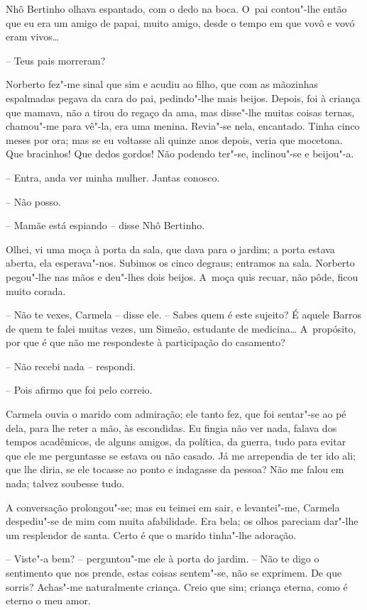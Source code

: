 Nhô Bertinho olhava espantado, com o dedo na boca. O~pai contou"-lhe
então que eu era um amigo de papai, muito amigo, desde o tempo em que
vovô e vovó eram vivos\ldots{}

-- Teus pais morreram?

Norberto fez"-me sinal que sim e acudiu ao filho, que com as mãozinhas
espalmadas pegava da cara do pai, pedindo"-lhe mais beijos. Depois, foi à
criança que mamava, não a tirou do regaço da ama, mas disse"-lhe muitas
coisas ternas, chamou"-me para vê"-la, era uma menina. Revia"-se nela,
encantado. Tinha cinco meses por ora; mas se eu voltasse ali quinze anos
depois, veria que mocetona. Que bracinhos! Que dedos gordos! Não podendo
ter"-se, inclinou"-se e beijou"-a.

-- Entra, anda ver minha mulher. Jantas conosco.

-- Não posso.

-- Mamãe está espiando -- disse Nhô Bertinho.

Olhei, vi uma moça à porta da sala, que dava para o jardim; a porta
estava aberta, ela esperava"-nos. Subimos os cinco degraus; entramos na
sala. Norberto pegou"-lhe nas mãos e deu"-lhes dois beijos. A~moça quis
recuar, não pôde, ficou muito corada.

-- Não te vexes, Carmela -- disse ele. -- Sabes quem é este sujeito? É
aquele Barros de quem te falei muitas vezes, um Simeão, estudante de
medicina\ldots{} A~propósito, por que é que não me respondeste à participação
do casamento?

-- Não recebi nada -- respondi.

-- Pois afirmo que foi pelo correio.

Carmela ouvia o marido com admiração; ele tanto fez, que foi sentar"-se
ao pé dela, para lhe reter a mão, às escondidas. Eu fingia não ver nada,
falava dos tempos acadêmicos, de alguns amigos, da política, da guerra,
tudo para evitar que ele me perguntasse se estava ou não casado. Já me
arrependia de ter ido ali; que lhe diria, se ele tocasse ao ponto e
indagasse da pessoa? Não me falou em nada; talvez soubesse tudo.

A conversação prolongou"-se; mas eu teimei em sair, e levantei"-me,
Carmela despediu"-se de mim com muita afabilidade. Era bela; os olhos
pareciam dar"-lhe um resplendor de santa. Certo é que o marido tinha"-lhe
adoração.

-- Viste"-a bem? -- perguntou"-me ele à porta do jardim. -- Não te digo o
sentimento que nos prende, estas coisas sentem"-se, não se exprimem. De
que sorris? Achas"-me naturalmente criança. Creio que sim; criança
eterna, como é eterno o meu amor.

